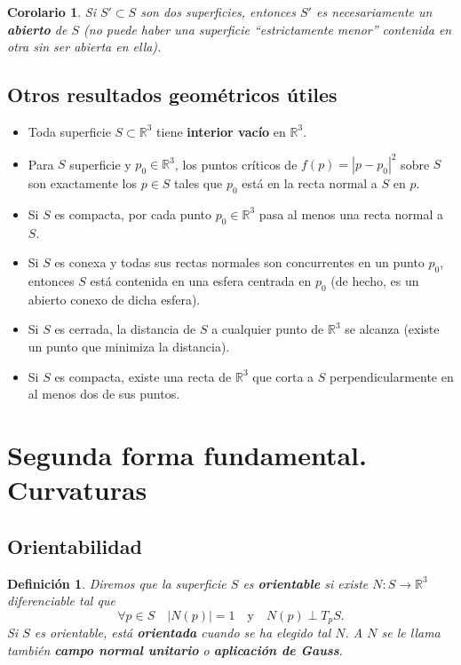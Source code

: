 \documentclass[11pt]{article}
\theoremstyle{plain}
\newtheorem{definicion}[teorema]{Definición}
\newtheorem{corolario}[teorema]{Corolario}
\theoremstyle{definition}
\theoremstyle{remark}
\begin{document}
\begin{corolario}
Si $S'\subset S$ son dos superficies, entonces $S'$ es necesariamente un \textbf{abierto} de $S$ (no puede haber una superficie ``estrictamente menor'' contenida en otra sin ser abierta en ella).
\end{corolario}

\subsection{Otros resultados geométricos útiles}

\begin{itemize}
\item Toda superficie $S\subset\mathbb{R}^3$ tiene \textbf{interior vacío} en $\mathbb{R}^3$.
\item Para $S$ superficie y $p_0\in\mathbb{R}^3$, los puntos críticos de $f(p)=|p-p_0|^2$ sobre $S$ son exactamente los $p\in S$ tales que $p_0$ está en la recta normal a $S$ en $p$.
\item Si $S$ es compacta, por cada punto $p_0\in\mathbb{R}^3$ pasa al menos una recta normal a $S$.
\item Si $S$ es conexa y todas sus rectas normales son concurrentes en un punto $p_0$, entonces $S$ está contenida en una esfera centrada en $p_0$ (de hecho, es un abierto conexo de dicha esfera).
\item Si $S$ es cerrada, la distancia de $S$ a cualquier punto de $\mathbb{R}^3$ se alcanza (existe un punto que minimiza la distancia).
\item Si $S$ es compacta, existe una recta de $\mathbb{R}^3$ que corta a $S$ perpendicularmente en al menos dos de sus puntos.
\end{itemize}

\section{Segunda forma fundamental. Curvaturas}

\subsection{Orientabilidad}

\begin{definicion}
Diremos que la superficie $S$ es \textbf{orientable} si existe $N:S\to \mathbb{R}^3$ diferenciable tal que
\[
\forall p\in S \quad |N(p)| = 1 \quad \text{y}\quad N(p)\perp T_pS.
\]
Si $S$ es orientable, está \textbf{orientada} cuando se ha elegido tal $N$. A $N$ se le llama también \textbf{campo normal unitario} o \textbf{aplicación de Gauss}.
\end{definicion}
\end{document}
